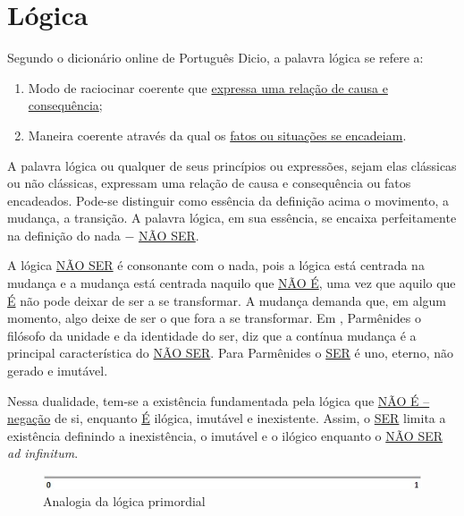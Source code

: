 \section{Lógica}
Segundo o dicionário online de Português Dicio\cite{dicio_logica}, a palavra lógica se refere a:
	\begin{enumerate}
	   \item Modo de raciocinar coerente que \underline{expressa uma relação de causa e consequência};
	   \item Maneira coerente através da qual os \underline{fatos ou situações se encadeiam}. 
	\end{enumerate}
 
\bigbreak
A palavra lógica ou qualquer de seus princípios ou expressões, sejam elas clássicas ou não clássicas, expressam uma relação de causa e consequência ou fatos encadeados. Pode-se distinguir como essência da definição acima o movimento, a mudança, a transição. A palavra lógica, em sua essência, se encaixa perfeitamente na definição do nada − \underline{NÃO SER}.

A lógica \underline{NÃO SER} é consonante com o nada, pois a lógica está centrada na mudança e a mudança está centrada naquilo que \underline{NÃO É}, uma vez que aquilo que \underline{É} não pode deixar de ser a se transformar. A mudança demanda que, em algum momento, algo deixe de ser o que fora a se transformar. Em , Parmênides  o filósofo da unidade e da identidade do ser, diz que a contínua mudança é a principal característica do \underline{NÃO SER}. Para Parmênides o \underline{SER} é uno, eterno, não gerado e imutável.

Nessa dualidade, tem-se a existência fundamentada pela lógica que \underline{NÃO É – negação} de si, enquanto \underline{É} ilógica, imutável e inexistente. Assim, o \underline{SER} limita a existência definindo a inexistência, o imutável e o ilógico enquanto o \underline{NÃO SER} \textit{ad infinitum}.
	\begin{figure}[H]
	\caption{Analogia da lógica primordial}
	\label{fig:primordial_logic_representation}
	\centering
	\includegraphics[scale=1]{sections/images/primordial_logic_representation.jpg}
	\end{figure}

